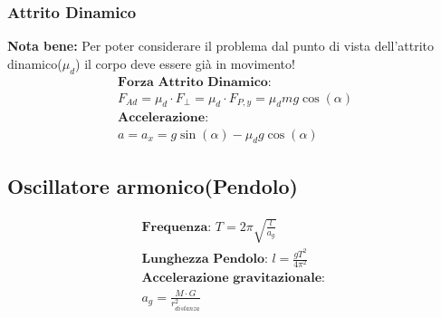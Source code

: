 \subsubsection{Attrito Dinamico}
\textbf{Nota bene: } Per poter considerare il problema dal punto di vista dell'attrito dinamico($\mu_d$) il corpo deve essere già in movimento!
\begin{gather*}
    \textbf{Forza Attrito Dinamico:} \\ F_{Ad} = \mu_d \cdot F_\perp = \mu_d \cdot F_{P, y} = \mu_d m g \cos (\alpha) \\
    \textbf{Accelerazione: } \\ a = a_x = g \sin (\alpha) - \mu_d g \cos (\alpha)
\end{gather*}






\subsection{Oscillatore armonico(Pendolo)}
\begin{gather*}
    \textbf{Frequenza: } T = 2 \pi \sqrt{\frac{l}{a_g}} \\
    \textbf{Lunghezza Pendolo: } l = \frac{g T^2}{4 \pi^2} \\
    \textbf{Accelerazione gravitazionale: } \\ a_g = \frac{M \cdot G}{r_{distanza}^2}
\end{gather*}
